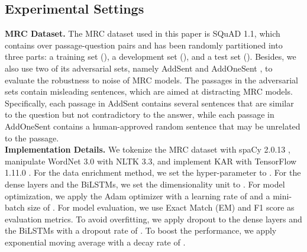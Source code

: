 \documentclass[11pt,a4paper]{article}
\begin{document}
\subsection{Experimental Settings}
\textbf{MRC Dataset.} The MRC dataset used in this paper is SQuAD 1.1, which contains over  passage-question pairs and has been randomly partitioned into three parts: a training set (), a development set (), and a test set (). Besides, we also use two of its adversarial sets, namely AddSent and AddOneSent \cite{jiarobin:2017}, to evaluate the robustness to noise of MRC models. The passages in the adversarial sets contain misleading sentences, which are aimed at distracting MRC models. Specifically, each passage in AddSent contains several sentences that are similar to the question but not contradictory to the answer, while each passage in AddOneSent contains a human-approved random sentence that may be unrelated to the passage. \\
\textbf{Implementation Details.} We tokenize the MRC dataset with spaCy 2.0.13 \cite{honnibalmatthew:2017}, manipulate WordNet 3.0 with NLTK 3.3, and implement KAR with TensorFlow 1.11.0 \cite{abadimartin:2016}. For the data enrichment method, we set the hyper-parameter  to . For the dense layers and the BiLSTMs, we set the dimensionality unit  to . For model optimization, we apply the Adam \cite{kingmadiederikp:2014} optimizer with a learning rate of  and a mini-batch size of . For model evaluation, we use Exact Match (EM) and F1 score as evaluation metrics. To avoid overfitting, we apply dropout \cite{srivastavanitish:2014} to the dense layers and the BiLSTMs with a dropout rate of . To boost the performance, we apply exponential moving average with a decay rate of .
\end{document}
